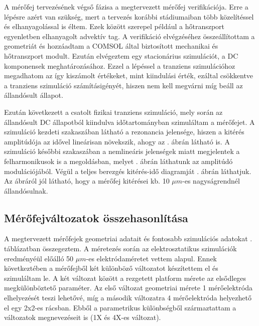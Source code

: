 A mérőfej tervezésének végső fázisa a megtervezett mérőfej verifikációja. Erre a lépésre azért van szükség, mert a tervezés korábbi stádiumaiban több közelítéssel és elhanyagolással is éltem. Ezek között szerepel például a hőtranszport egyenletben elhanyagolt advektív tag. A verifikáció elvégzéséhez összeállítottam a geometriát és hozzáadtam a COMSOL által biztosított mechanikai és hőtranszport modult. Ezután elvégeztem egy stacionárius szimulációt, a DC komponensek meghatározásához. Ezzel a lépéssel a tranziens szimulációhoz megadhatom az így kiszámolt értékeket, mint kiindulási érték, ezáltal csökkentve a tranziens szimuláció számításigényét, hiszen nem kell megvárni míg beáll az állandósult állapot.

Ezután következett a csatolt fizikai tranziens szimuláció, mely során az állandósult DC állapotból kiindulva időtartományban szimuláltam a mérőfejet. A szimuláció kezdeti szakaszában látható a rezonancia jelensége, hiszen a kitérés amplitúdója az idővel lineárisan növekszik, ahogy az . ábrán látható is. A szimuláció későbbi szakaszában a nemlineáris jelenségek miatt megjelentek a felharmonikusok is a megoldásban, melyet . ábrán láthatunk az amplitúdó modulációjából. Végül a teljes berezgés kitérés-idő diagramját . ábrán láthatjuk. Az ábráról jól látható, hogy a mérőfej kitérései kb. 10 $\mu m$-es nagyságrendnél állandósulnak.


\subsection{Mérőfejváltozatok összehasonlítása}

A megtervezett mérőfejek geometriai adatait és fontosabb szimulációs adatokat . táblázatban összegeztem. A méretezés során az elektrosztatikus szimulációk eredményéül előálló 50 $\mu m$-es elektródaméretet vettem alapul. Ennek következtében a mérőfejből két különböző változatot készítettem el és szimuláltam le. A két változat között a rezgetett platform mérete az elsődleges megkülönböztető paraméter. Az első változat geometriai mérete 1 mérőelektróda elhelyezését teszi lehetővé, míg a második változatra 4 mérőelektróda helyezhető el egy 2x2-es rácsban. Ebből a parametrikus különbségből származtattam a változatok megnevezéseit is (1X és 4X-es változat).

